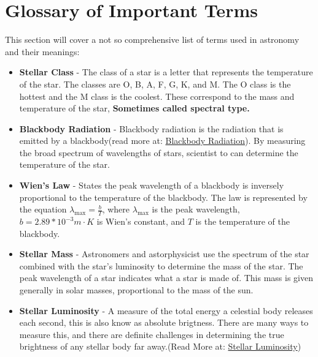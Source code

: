 \documentclass[12pt,oneside,a4paper,english]{article}
\begin{document}
\section{Glossary of Important Terms}
This section will cover a not so comprehensive list of terms used in astronomy and their meanings:
\begin{itemize}
    \item \textbf{Stellar Class} - The class of a star is a letter that represents the temperature of the star. The classes are O, B, A, F, G, K, and M. The O class is the hottest and the M class is the coolest. These correspond to the mass and temperature of the star,  \textbf{Sometimes called spectral type.}
    \item  \textbf{Blackbody Radiation} - Blackbody radiation is the radiation that is emitted by a blackbody(read more at: \href{https://phys.libretexts.org/Bookshelves/University_Physics/University_Physics_(OpenStax)/University_Physics_III_-_Optics_and_Modern_Physics_(OpenStax)/06%3A_Photons_and_Matter_Waves/6.02%3A_Blackbody_Radiation}{Blackbody Radiation}). By measuring the broad spectrum of wavelengths of stars, scientist to can determine the temperature of the star.
    \item \textbf{Wien's Law} - States the peak wavelength of a blackbody is inversely proportional to the temperature of the blackbody. The law is represented by the equation $\lambda_{\text{max}} = \frac{b}{T}$, where $\lambda_{\text{max}}$ is the peak wavelength, $b=2.89*10^{-3} m \cdot K$ is Wien's constant, and $T$ is the temperature of the blackbody.
    \item \textbf{Stellar Mass} - Astronomers and astorphysicist use the spectrum of the star combined with the star's luminosity to determine the mass of the star. The peak wavelength of a star indicates what a star is made of. This mass is given generally in solar masses, proportional to the mass of the sun.
    \item \textbf{Stellar Luminosity} - A measure of the total energy a celestial body releases each second, this is also know as absolute brigtness. There are many ways to measure this, and there are definite challenges in determining the true brightness of any stellar body far away.(Read More at: \href{https://www.teachastronomy.com/textbook/Properties-of-Stars/Stellar-Luminosity/}{Stellar Luminosity})
\end{itemize}
\end{document}

